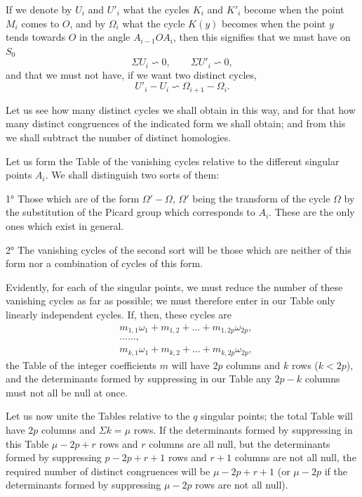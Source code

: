 \documentclass{article}
\begin{document}
If we denote by $U_{i}$ and $U'_{i}$ what the cycles $K_{i}$ and $K'_{i}$ become when the point $M_{i}$ comes to $O$, and by $\Omega_{i}$ what the cycle $K(y)$ becomes when the point $y$ tends towards $O$ in the angle $A_{i-1}OA_{i}$, then this signifies that we must have on $S_{0}$
\[ \Sigma U_{i} \backsim 0, \qquad \Sigma U'_{i} \backsim 0, \]
and that we must not have, if we want two distinct cycles,
\[ U'_{i} - U_{i} \backsim \Omega_{i+1} - \Omega_{i}. \]

Let us see how many distinct cycles we shall obtain in this way, and for that how many distinct congruences of the indicated form we shall obtain; and from this we shall subtract the number of distinct homologies.


Let us form the Table of the vanishing cycles relative to the different singular points $A_{i}$. We shall distinguish two sorts of them:

1° Those which are of the form $\Omega' - \Omega$, $\Omega'$ being the transform of the cycle $\Omega$ by the substitution of the Picard group which corresponds to $A_{i}$. These are the only ones which exist in general.

2° The vanishing cycles of the second sort will be those which are neither of this form nor a combination of cycles of this form.

Evidently, for each of the singular points, we must reduce the number of these vanishing cycles as far as possible; we must therefore enter in our Table only linearly independent cycles. If, then, these cycles are
\[ \begin{aligned} &m_{1,1}\omega_{1} + m_{1,2} + \ldots + m_{1,2p}\omega_{2p},\\ &\ldots\ldots,\\ &m_{k,1}\omega_{1} + m_{k,2} + \ldots + m_{k,2p}\omega_{2p}, \end{aligned} \]
the Table of the integer coefficients $m$ will have $2p$ columns and $k$ rows ($k < 2p$), and the determinants formed by suppressing in our Table any $2p - k$ columns must not all be null at once.

Let us now unite the Tables relative to the $q$ singular points; the total Table will have $2p$ columns and $\Sigma k = \mu$ rows. If the determinants formed by suppressing in this Table $\mu - 2p + r$ rows and $r$ columns are all null, but the determinants formed by suppressing $p - 2p + r + 1$ rows and $r + 1$ columns are not all null, the required number of distinct congruences will be $\mu - 2p + r + 1$ (or $\mu - 2p$ if the determinants formed by suppressing $\mu - 2p$ rows are not all null).
\end{document}
